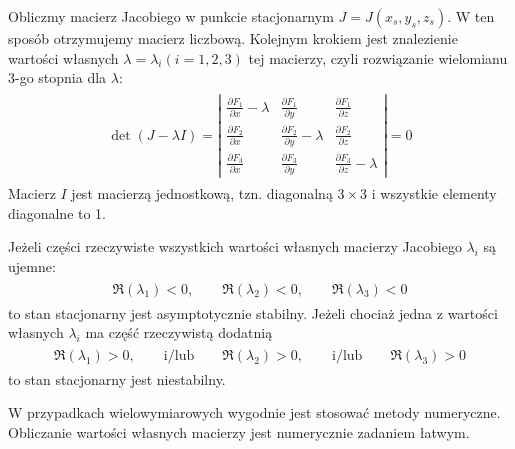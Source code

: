 \documentclass[a4paper,12pt,polish]{sphinxmanual}
\begin{document}
Obliczmy  macierz Jacobiego w punkcie stacjonarnym $J=J(x_s, y_s, z_s)$.  W ten sposób otrzymujemy macierz liczbową. Kolejnym krokiem jest znalezienie wartości własnych $\lambda = \lambda_i   (i=1, 2, 3)$   tej macierzy, czyli rozwiązanie  wielomianu 3-go stopnia dla $\lambda$:
\label{ch1/chI023:equation-eqn55}\begin{gather}
\begin{split} \det (J -\lambda I)  = \left| \begin{array}{ccc}\frac{ \partial F_1}{\partial x} -\lambda & \frac{\partial F_1}{\partial y}&\frac{ \partial F_1}{\partial z}\\ \frac{ \partial F_2}{\partial x}&  \frac{ \partial F_2}{\partial y} -\lambda &\frac{ \partial F_2}{\partial z} \\ \frac{ \partial F_3}{\partial x}& \frac{ \partial F_3}{\partial y}&\frac{ \partial F_3}{\partial z} -\lambda \end{array} \right| =  0\end{split}\label{ch1/chI023-eqn55}
\end{gather}
Macierz $I$ jest macierzą jednostkową, tzn. diagonalną $3\times 3$ i wszystkie elementy diagonalne to 1.

Jeżeli części  rzeczywiste  wszystkich wartości własnych macierzy Jacobiego $\lambda_i$ są  ujemne:
\label{ch1/chI023:equation-eqn56}\begin{gather}
\begin{split} \Re(\lambda_1) < 0, \qquad \Re(\lambda_2) < 0, \qquad \Re(\lambda_3) < 0\end{split}\label{ch1/chI023-eqn56}
\end{gather}
to  stan stacjonarny jest asymptotycznie stabilny. Jeżeli  chociaż jedna z wartości własnych $\lambda_i$ ma część rzeczywistą dodatnią
\label{ch1/chI023:equation-eqn57}\begin{gather}
\begin{split} \Re(\lambda_1) > 0, \qquad \mbox{i/lub} \qquad \Re(\lambda_2) >  0, \qquad \mbox{i/lub} \qquad \Re(\lambda_3) >  0\end{split}\label{ch1/chI023-eqn57}
\end{gather}
to stan stacjonarny jest niestabilny.

W przypadkach wielowymiarowych wygodnie jest stosować metody numeryczne. Obliczanie wartości własnych macierzy jest numerycznie zadaniem łatwym.
\end{document}
